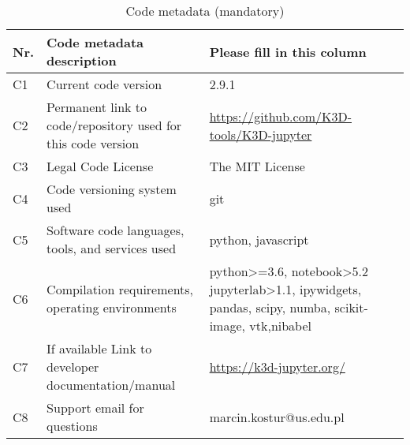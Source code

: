 \documentclass[preprint,12pt, a4paper]{elsarticle}
\begin{document}
\begin{table}[!h]
\begin{tabular}{|l|p{6.5cm}|p{6.5cm}|}
\hline
\textbf{Nr.} & \textbf{Code metadata description} & \textbf{Please fill in this column} \\
\hline
C1 & Current code version & 2.9.1 \\
\hline
C2 & Permanent link to code/repository used for this code version & \url{https://github.com/K3D-tools/K3D-jupyter} \\
\hline
C3 & Legal Code License   &The MIT License  \\
\hline
C4 & Code versioning system used & git \\
\hline
C5 & Software code languages, tools, and services used &  python, javascript \\
\hline
C6 & Compilation requirements, operating environments &  python>=3.6, notebook>5.2
   jupyterlab>1.1,
   ipywidgets,
   pandas,
   scipy,
   numba,
   scikit-image,
   vtk,nibabel \\
\hline
C7 & If available Link to developer documentation/manual & \url{https://k3d-jupyter.org/} \\
\hline
C8 & Support email for questions & marcin.kostur@us.edu.pl  \\
\hline
\end{tabular}
\caption{Code metadata (mandatory)}
\label{} 
\end{table}
\end{document}
